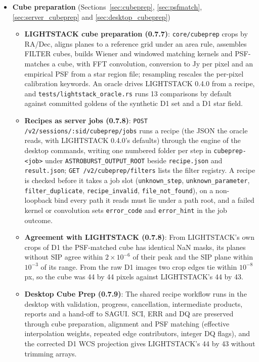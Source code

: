 \documentclass[11pt,a4paper]{article}
\newcommand{\code}[1]{\texttt{\small #1}}
\begin{document}
\begin{itemize}[nosep]
\begin{itemize}[nosep]
        \end{itemize}
    \item \textbf{Cube preparation} (Sections~\ref{sec:cubeprep}, \ref{sec:psfmatch}, \ref{sec:server_cubeprep} and \ref{sec:desktop_cubeprep})
        \begin{itemize}[nosep]
        \item \textbf{LIGHTSTACK cube preparation (0.7.7)}: \code{core/cubeprep} crops by RA/Dec, aligns planes to a reference grid under an area rule, assembles FILTER cubes, builds Wiener and windowed matching kernels and PSF-matches a cube, with FFT convolution, conversion to Jy per pixel and an empirical PSF from a star region file; resampling rescales the per-pixel calibration keywords. An oracle drives LIGHTSTACK 0.4.0 from a recipe, and \code{tests/\allowbreak lightstack\_oracle.rs} runs 13 comparisons by default against committed goldens of the synthetic D1 set and a D1 star field.
        \item \textbf{Recipes as server jobs (0.7.8)}: \code{POST /v2/\allowbreak sessions/\allowbreak :sid/\allowbreak cubeprep/\allowbreak jobs} runs a recipe (the JSON the oracle reads, with LIGHTSTACK 0.4.0's defaults) through the engine of the desktop commands, writing one numbered folder per step in \code{cubeprep-<job>} under \code{ASTROBURST\_OUTPUT\_ROOT} beside \code{recipe.json} and \code{result.json}; \code{GET /v2/\allowbreak cubeprep/\allowbreak filters} lists the filter registry. A recipe is checked before it takes a job slot (\code{unknown\_step}, \code{unknown\_parameter}, \code{filter\_duplicate}, \code{recipe\_invalid}, \code{file\_not\_found}), on a non-loopback bind every path it reads must lie under a path root, and a failed kernel or convolution sets \code{error\_code} and \code{error\_hint} in the job outcome.
        \item \textbf{Agreement with LIGHTSTACK (0.7.8)}: From LIGHTSTACK's own crops of D1 the PSF-matched cube has identical NaN masks, its planes without SIP agree within $2\times10^{-6}$ of their peak and the SIP plane within $10^{-3}$ of its range. From the raw D1 images two crop edges tie within $10^{-8}$\,px, so the cube was 44 by 44 pixels against LIGHTSTACK's 44 by 43.
        \item \textbf{Desktop Cube Prep (0.7.9)}: The shared recipe workflow runs in the desktop with validation, progress, cancellation, intermediate products, reports and a hand-off to SAGUI. SCI, ERR and DQ are preserved through cube preparation, alignment and PSF matching (effective interpolation weights, repeated edge contributors, integer DQ flags), and the corrected D1 WCS projection gives LIGHTSTACK's 44 by 43 without trimming arrays.

\end{itemize}
\end{itemize}
\end{document}
